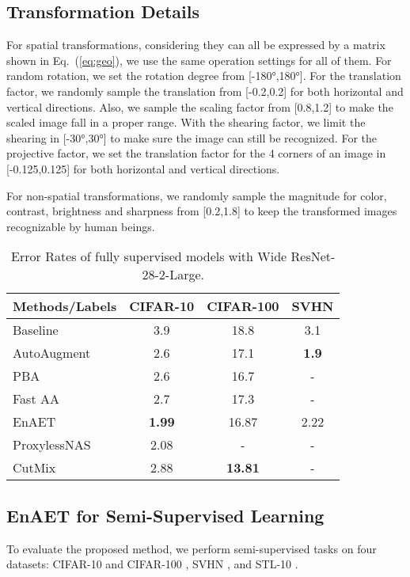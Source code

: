 \documentclass[journal]{IEEEtran}
\begin{document}
\subsection{Transformation Details}
\par For spatial transformations, considering they can all be expressed by a matrix shown in Eq.~(\ref{eq:geo}), we use the same operation settings for all of them. For random rotation, we set the rotation degree from [\ang{-180},\ang{180}]. For the translation factor, we randomly sample the translation from [-0.2,0.2] for both horizontal and vertical directions. Also, we sample the scaling factor from [0.8,1.2] to make the scaled image fall in a proper range. With the shearing factor, we limit the shearing in [\ang{-30},\ang{30}] to make sure the image can still be recognized. For the projective factor, we set the translation factor for the 4 corners of an image in [-0.125,0.125] for both horizontal and vertical directions.
\par For non-spatial transformations, we randomly sample the magnitude for color, contrast, brightness and sharpness from [0.2,1.8] to keep the transformed images recognizable by human beings.
\begin{table}[]
\vspace{-0.5cm}
\centering
\caption{Error Rates of fully supervised models with Wide ResNet-28-2-Large.}
\label{tab:largefull}
\begin{tabular}{lccc}
\toprule
Methods/Labels & CIFAR-10 & CIFAR-100 & SVHN \\ \midrule
Baseline \cite{zagoruyko2016wide} & 3.9 & 18.8 & 3.1 \\
AutoAugment \cite{cubuk2018autoaugment} & 2.6 & 17.1 & \textbf{1.9} \\
PBA \cite{ho2019population} & 2.6 & 16.7 & - \\
Fast AA \cite{lim2019fast} & 2.7 & 17.3 & - \\
EnAET & \textbf{1.99} & 16.87 & 2.22 \\ \midrule
ProxylessNAS \cite{cai2018proxylessnas} & 2.08 & - & - \\
CutMix \cite{yun2019cutmix} & 2.88 & \textbf{13.81} & - \\ \bottomrule
\end{tabular}
\vspace{-0.5cm}
\end{table}
\subsection{EnAET for Semi-Supervised Learning}
\label{sec:ssl}
To evaluate the proposed method, we perform semi-supervised tasks on four datasets: CIFAR-10 and CIFAR-100 \cite{krizhevsky2009learning}, SVHN \cite{netzer2011reading}, and STL-10 \cite{coates2011analysis}.
\end{document}
